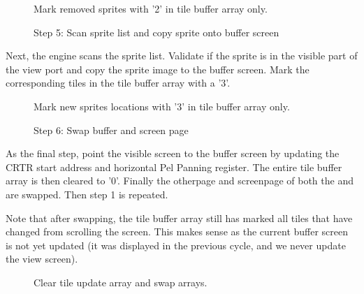 \documentclass[book.tex]{subfiles}
\begin{document}
\begin{figure}[H]
\centering
 \caption{Mark removed sprites with '2' in tile buffer array only.}
 \label{fig:kc1_3_tile_update_remove}
\end{figure}


\pagebreak

\begin{figure}[H]
\centering
 \caption{Step 5: Scan sprite list and copy sprite onto buffer screen}
 \label{fig:kc1_3_update_sprite}
\end{figure}

Next, the engine scans the sprite list. Validate if the sprite is in the visible part of the view port and copy the sprite image to the buffer screen. Mark the corresponding tiles in the tile buffer array with a '3'.

\begin{figure}[H]
\centering
 \caption{Mark new sprites locations with '3' in tile buffer array only.}
 \label{fig:kc1_3_tile_update_sprite}
\end{figure}


\pagebreak


\begin{figure}[H]
\centering
 \caption{Step 6: Swap buffer and screen page}
 \label{fig:kc1_3_update_final}
\end{figure}


As the final step, point the visible screen to the buffer screen by updating the CRTR start address and horizontal Pel Panning register. The entire tile buffer array is then cleared to '0'. Finally the otherpage and screenpage of both the  and  are swapped. Then step 1 is repeated. \\
\par
Note that after swapping, the tile buffer array still has marked all tiles that have changed from scrolling the screen. This makes sense as the current buffer screen is not yet updated (it was displayed in the previous cycle, and we never update the view screen). 

\begin{figure}[H]
\centering
 \caption{Clear tile update array and swap arrays.}
 \label{fig:kc1_3_tile_final}
\end{figure}
\end{document}
